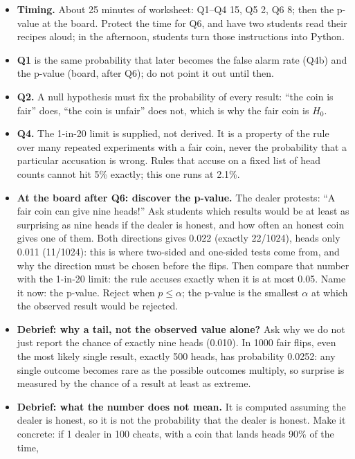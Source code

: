 \documentclass[11pt]{article}
\begin{document}
\begin{itemize}[leftmargin=1.2em, itemsep=3pt]
  \item \textbf{Timing.} About 25 minutes of worksheet: Q1--Q4 15, Q5 2, Q6 8;
    then the p-value at the board.
    Protect the time for Q6, and have two students read their recipes aloud;
    in the afternoon, students turn those instructions into Python.
  \item \textbf{Q1} is the same probability that later becomes the false alarm rate (Q4b)
    and the p-value (board, after Q6); do not point it out until then.
  \item \textbf{Q2.} A null hypothesis must fix the probability of every result:
    ``the coin is fair'' does, ``the coin is unfair'' does not, which is why the fair coin is $H_0$.
  \item \textbf{Q4.} The 1-in-20 limit is supplied, not derived.
    It is a property of the rule over many repeated experiments with a fair coin,
    never the probability that a particular accusation is wrong.
    Rules that accuse on a fixed list of head counts cannot hit 5\% exactly; this one runs at 2.1\%.
  \item \textbf{At the board after Q6: discover the p-value.}
    The dealer protests: ``A fair coin can give nine heads!''
    Ask students which results would be at least as surprising as nine heads if the dealer is honest,
    and how often an honest coin gives one of them.
    Both directions gives 0.022 (exactly 22/1024), heads only 0.011 (11/1024):
    this is where two-sided and one-sided tests come from,
    and why the direction must be chosen before the flips.
    Then compare that number with the 1-in-20 limit: the rule accuses exactly when it is at most 0.05.
    Name it now: the p-value. Reject when $p \le \alpha$;
    the p-value is the smallest $\alpha$ at which the observed result would be rejected.
  \item \textbf{Debrief: why a tail, not the observed value alone?}
    Ask why we do not just report the chance of exactly nine heads (0.010).
    In 1000 fair flips, even the most likely single result, exactly 500 heads, has probability 0.0252:
    any single outcome becomes rare as the possible outcomes multiply,
    so surprise is measured by the chance of a result at least as extreme.
  \item \textbf{Debrief: what the number does not mean.}
    It is computed assuming the dealer is honest, so it is not the probability that the dealer is honest.
    Make it concrete: if 1 dealer in 100 cheats, with a coin that lands heads 90\% of the time,

\end{itemize}
\end{document}

